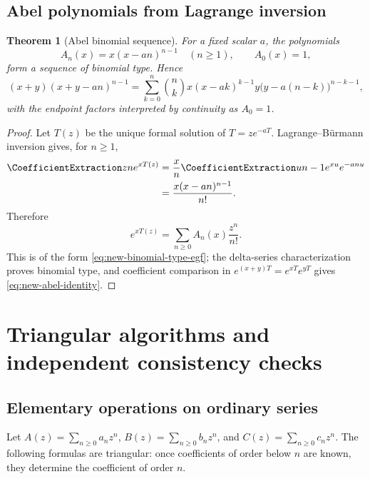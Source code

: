 \documentclass[11pt,a4paper,oneside,openany]{book}
\newtheorem{theorem}{Theorem}[chapter]
\theoremstyle{definition}
\theoremstyle{remark}
\begin{document}
\section{Abel polynomials from Lagrange inversion}

\begin{theorem}[Abel binomial sequence]\label{thm:new-abel}
For a fixed scalar $a$, the polynomials
\begin{equation}\label{eq:new-abel-polynomials}
 A_n(x)=x(x-an)^{n-1}\quad(n\ge1),\qquad A_0(x)=1,
\end{equation}
form a sequence of binomial type.  Hence
\begin{equation}\label{eq:new-abel-identity}
 (x+y)(x+y-an)^{n-1}
 =\sum_{k=0}^n\binom nk
 x(x-ak)^{k-1}y\bigl(y-a(n-k)\bigr)^{n-k-1},
\end{equation}
with the endpoint factors interpreted by continuity as $A_0=1$.
\end{theorem}

\begin{proof}
Let $T(z)$ be the unique formal solution of
$T=ze^{-aT}$.  Lagrange--Bürmann inversion gives, for $n\ge1$,
\begin{align*}
 \CoefficientExtraction z n e^{xT(z)}
 &=\frac{x}{n}\CoefficientExtraction u{n-1}e^{xu}e^{-anu}\\
 &=\frac{x(x-an)^{n-1}}{n!}.
\end{align*}
Therefore
\[
 e^{xT(z)}=\sum_{n\ge0}A_n(x)\frac{z^n}{n!}.
\]
This is of the form \eqref{eq:new-binomial-type-egf}; the delta-series
characterization proves binomial type, and coefficient comparison in
$e^{(x+y)T}=e^{xT}e^{yT}$ gives \eqref{eq:new-abel-identity}.
\end{proof}

\chapter{Triangular algorithms and independent consistency checks}
\label{ch:series-algorithms}

\section{Elementary operations on ordinary series}

Let $A(z)=\sum_{n\ge0}a_nz^n$, $B(z)=\sum_{n\ge0}b_nz^n$, and
$C(z)=\sum_{n\ge0}c_nz^n$.  The following formulas are triangular: once
coefficients of order below $n$ are known, they determine the coefficient of
order $n$.
\end{document}
